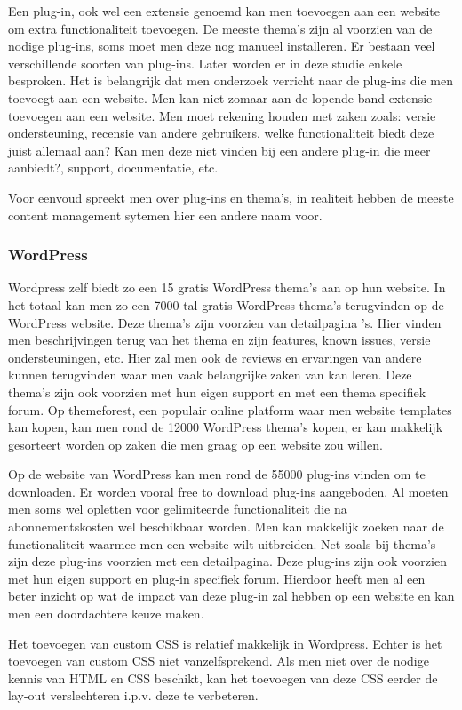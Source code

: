 Een plug-in, ook wel een extensie genoemd kan men toevoegen aan een website om extra functionaliteit toevoegen. De meeste thema's zijn al voorzien van de nodige plug-ins, soms moet men deze nog manueel installeren. Er bestaan veel verschillende soorten van plug-ins. Later worden er in deze studie enkele besproken. Het is belangrijk dat men onderzoek verricht naar de plug-ins die men toevoegt aan een website. Men kan niet zomaar aan de lopende band extensie toevoegen aan een website. Men moet rekening houden met zaken zoals: versie ondersteuning, recensie van andere gebruikers, welke functionaliteit biedt deze juist allemaal aan? Kan men deze niet vinden bij een andere plug-in die meer aanbiedt?, support, documentatie, etc.

Voor eenvoud spreekt men over plug-ins en thema's, in realiteit hebben de meeste content management sytemen hier een andere naam voor.
\subsubsection{WordPress}
Wordpress zelf biedt zo een 15 gratis WordPress thema's aan op hun website. In het totaal kan men zo een 7000-tal gratis WordPress thema's terugvinden op de WordPress website. Deze thema's zijn voorzien van detailpagina 's. Hier vinden men beschrijvingen terug van het thema en zijn features, known issues, versie ondersteuningen, etc. Hier zal men ook de reviews en ervaringen van andere kunnen terugvinden waar men vaak belangrijke zaken van kan leren. Deze thema's zijn ook voorzien met hun eigen support en met een thema specifiek forum. Op themeforest, een populair online platform waar men website templates kan kopen, kan men  rond de 12000 WordPress thema's kopen, er kan makkelijk gesorteert worden op zaken die men graag op een website zou willen.

Op de website van WordPress kan men rond de 55000 plug-ins vinden om te downloaden. Er worden vooral free to download plug-ins aangeboden. Al moeten men soms wel opletten voor gelimiteerde functionaliteit die na abonnementskosten wel beschikbaar worden. Men kan makkelijk zoeken naar de functionaliteit waarmee men een website wilt uitbreiden. Net zoals bij thema's zijn deze plug-ins voorzien met een detailpagina. Deze plug-ins zijn ook voorzien met hun eigen support en plug-in specifiek forum. Hierdoor heeft men al een beter inzicht op wat de impact van deze plug-in zal hebben op een website en kan men een doordachtere keuze maken.

Het toevoegen van custom CSS is relatief makkelijk in Wordpress. Echter is het toevoegen van custom CSS niet vanzelfsprekend. Als men niet over de nodige kennis van HTML en CSS beschikt, kan het toevoegen van deze CSS eerder de lay-out verslechteren i.p.v. deze te verbeteren.

